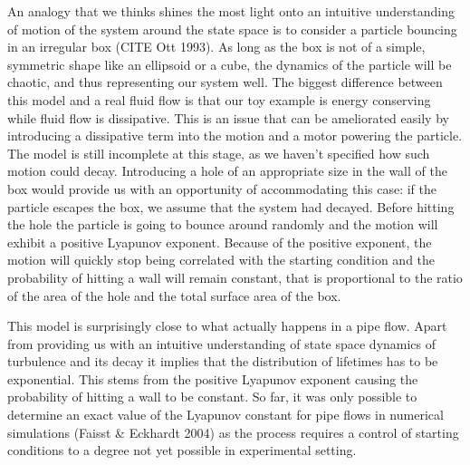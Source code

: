 \documentclass[11pt,a4paper]{article}
\begin{document}
An analogy that we thinks shines the most light onto an intuitive understanding of motion of the system around the state space is to consider a particle bouncing in an irregular box (CITE Ott 1993).
As long as the box is not of a simple, symmetric shape like an ellipsoid or a cube, the dynamics of the particle will be chaotic, and thus representing our system well.
The biggest difference between this model and a real fluid flow is that our toy example is energy conserving while fluid flow is dissipative.
This is an issue that can be ameliorated easily by introducing a dissipative term into the motion and a motor powering the particle.
The model is still incomplete at this stage, as we haven't specified how such motion could decay.
Introducing a hole of an appropriate size in the wall of the box would provide us with an opportunity of accommodating this case: if the particle escapes the box, we assume that the system had decayed.
Before hitting the hole the particle is going to bounce around randomly and the motion will exhibit a positive Lyapunov exponent.
Because of the positive exponent, the motion will quickly stop being correlated with the starting condition and the probability of hitting a wall will remain constant, that is proportional to the ratio of the area of the hole and the total surface area of the box.

This model is surprisingly close to what actually happens in a pipe flow.
Apart from providing us with an intuitive understanding of state space dynamics of turbulence and its decay it implies that the distribution of lifetimes has to be exponential.
This stems from the positive Lyapunov exponent causing the probability of hitting a wall to be constant.
So far, it was only possible to determine an exact value of the Lyapunov constant for pipe flows in numerical simulations (Faisst \& Eckhardt 2004) as the process requires a control of starting conditions to a degree not yet possible in experimental setting.

\end{document}
